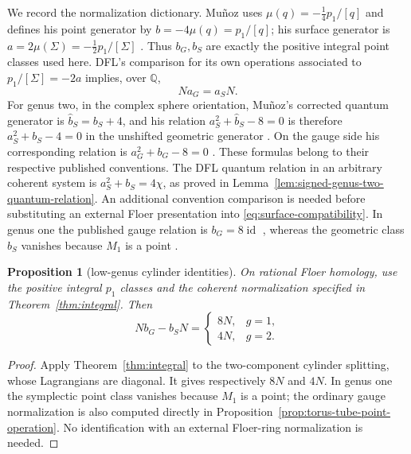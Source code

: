 \documentclass[11pt]{amsart}
\newtheorem{proposition}[theorem]{Proposition}
\theoremstyle{definition}
\theoremstyle{remark}
\theoremstyle{plain}
\newcommand{\QQ}{\mathbb{Q}}
\newcommand{\id}{\operatorname{id}}
\begin{document}
We record the normalization dictionary.  Mu\~noz uses
$\mu(q)=-\frac14p_1/[q]$ and defines his point generator by
$b=-4\mu(q)=p_1/[q]$; his surface generator is
$a=2\mu(\Sigma)=-\frac12p_1/[\Sigma]$
\cite[equation~(4)]{Munoz99a}.  Thus $b_G,b_S$ are exactly the positive
integral point classes used here. DFL's comparison for its own operations
associated to
$p_1/[\Sigma]=-2a$ implies, over $\QQ$,
\begin{equation}\label{eq:surface-compatibility}
                              Na_G=a_SN.
\end{equation}
For genus two, in the complex sphere orientation,
Mu\~noz's corrected quantum generator is
$\widehat b_S=b_S+4$, and his relation
$a_S^2+\widehat b_S-8=0$ is therefore
$a_S^2+b_S-4=0$ in the unshifted geometric generator
\cite[Example~24]{Munoz99b}.  On the gauge side his corresponding relation
is $a_G^2+b_G-8=0$ \cite[Example~22]{Munoz99a}.
These formulas belong to their respective published conventions.
The DFL quantum relation in an arbitrary coherent system is
$a_S^2+b_S=4\chi$, as proved in
Lemma~\ref{lem:signed-genus-two-quantum-relation}.
An additional convention comparison is needed before substituting
an external Floer presentation into \eqref{eq:surface-compatibility}.
In genus one the published gauge
relation is $b_G=8\id$ \cite[Lemma~11]{Munoz99a}, whereas the geometric
class $b_S$ vanishes because $M_1$ is a point
\cite[Example~23]{Munoz99b}.

\begin{proposition}[low-genus cylinder identities]
\label{prop:cylinder-identities}
On rational Floer homology, use the positive integral $p_1$
classes and the coherent normalization specified in
Theorem~\ref{thm:integral}. Then
\begin{equation}\label{eq:cylinder-identities}
 Nb_G-b_SN=
 \begin{cases}
 8N,&g=1,\\
 4N,&g=2.
 \end{cases}
\end{equation}
\end{proposition}

\begin{proof}
Apply Theorem~\ref{thm:integral}
to the two-component cylinder splitting, whose Lagrangians
are diagonal. It gives respectively $8N$ and $4N$.
In genus one the symplectic point class vanishes because
$M_1$ is a point; the ordinary gauge normalization is
also computed directly in
Proposition~\ref{prop:torus-tube-point-operation}.
No identification with an external Floer-ring normalization
is needed.
\end{proof}
\end{document}
